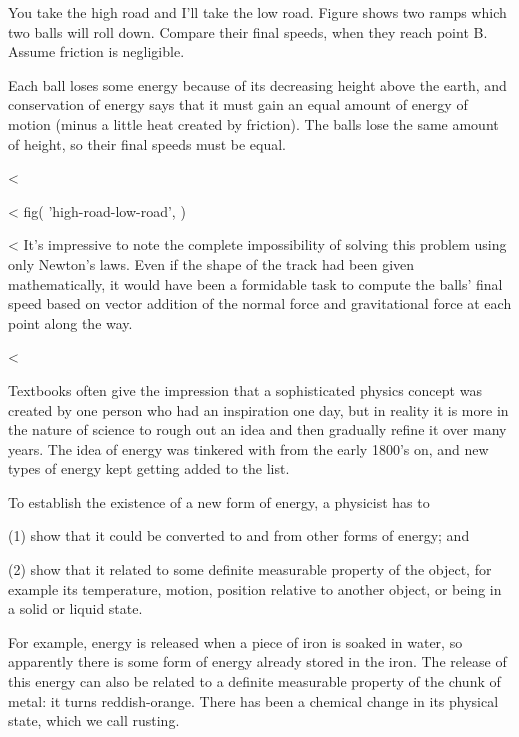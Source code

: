 \begin{eg}{You take the high road and I'll take the low road.}\label{eg:high-road-low-road}
\egquestion Figure  shows two ramps which two balls will
roll down. Compare their final speeds, when they reach point
B. Assume friction is negligible.

\eganswer Each ball loses some energy because of its
decreasing height above the earth, and conservation of
energy says that it must gain an equal amount of energy of
motion (minus a little heat created by friction). The balls
lose the same amount of height, so their final speeds must be equal.
\end{eg}

<%

<%
  fig(
    'high-road-low-road',
  )

<%
It's impressive to note the complete impossibility of
solving this problem using only Newton's laws. Even if the
shape of the track had been given mathematically, it would
have been a formidable task to compute the balls' final
speed based on vector addition of the normal force and
gravitational force at each point along the way.

<%

Textbooks often give the impression that a sophisticated
physics concept was created by one person who had an
inspiration one day, but in reality it is more in the nature
of science to rough out an idea and then gradually refine it
over many years. The idea of energy was tinkered with from
the early 1800's on, and new types of energy kept
getting added to the list.

 To establish the existence of a new form of energy, a physicist has to

(1) show that it could be converted to and from other
forms of energy; and

(2) show that it related to some definite measurable
property of the object, for example its temperature, motion,
position relative to another object, or being in a
solid or liquid state.

For example, energy is released when a piece of iron is
soaked in water, so apparently there is some form of energy
already stored in the iron. The release of this energy can
also be related to a definite measurable property of the
chunk of metal: it turns reddish-orange. There has been a
chemical change in its physical state, which we call rusting.

